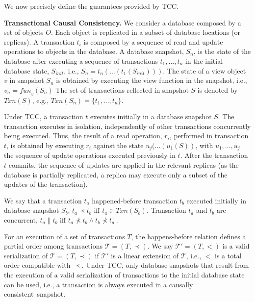 \documentclass[sigplan,twocolumn,review,anonymous]{acmart}
\begin{document}
We now precisely define the guarantees provided by TCC.

\noindent
\textbf{Transactional Causal Consistency.}
We consider a database composed by a set of objects $O$. Each object is replicated in a subset of 
database locations (or replicas).
A transaction $t_i$ is composed by a sequence of read and update operations to objects in the database.
A database snapshot, $S_n$, is the state of the database after executing a sequence of 
transactions $t_1,\ldots,t_n$ in the initial database state, $S_{init}$, i.e., $S_n =
t_n(\ldots(t_1(S_{init})))$.  The state of a view object $v$ in snapshot $S_n$ is obtained by executing
the view function in the snapshot, i.e.,  $v_n = \mathit{fun}_v(S_n)$
The set of transactions reflected in snapshot $S$ is denoted by $Txn(S)$,
e.g., $Txn(S_n) = \{t_1,\ldots,t_n\}$.

Under TCC, a transaction $t$  executes initially in a database snapshot $S$.
The transaction executes in isolation, independently of other transactions concurrently being executed. 
Thus, the result of a read operation, $r_i$, performed in transaction $t$, is obtained by executing $r_i$
against the state $u_j(\ldots(u_1(S))$, with $u_1,\ldots,u_j$ the sequence of update operations executed 
previously in $t$. After the transaction $t$ commits, the sequence of updates 
are applied
in the relevant replicas (as the database is partially replicated, a replica may execute only a subset 
of the updates of the transaction).

We say that a transaction $t_a$
happened-before transaction $t_b$ executed initially in  database snapshot $S_b$,
$t_a \! \prec \! t_b$ iff \mbox{$t_a \!\in \! Txn(S_b)$}.
Transaction $t_a$ and $t_b$ are concurrent, $t_a \parallel  t_b$ iff
$t_a \! \not \prec \! t_b  \wedge  t_b \! \not \prec \! t_a$ \cite{lamport78}.

For an execution of a  set of transactions $T$, the happens-before relation defines
a partial order among transactions \mbox{$\mathcal{T} = (T,\prec)$}.
We say $\mathcal{T'} = (T,<)$ is a valid serialization of $\mathcal{T} = (T,\prec)$
if $\mathcal{T'}$ is a linear extension of $\mathcal{T}$, i.e., $<$ is a total order
compatible with $\prec$.
Under TCC, only database snapshots that result from the 
execution of a valid serialization of transactions to the initial database state can be used, i.e.,
a transaction is always executed in a causally \mbox{consistent snapshot.}
\end{document}
